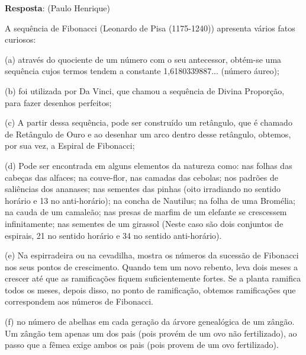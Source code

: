 {\color{red}
\textbf{Resposta}: (Paulo Henrique)

A sequência de Fibonacci (Leonardo de Pisa (1175-1240)) apresenta vários fatos curiosos:

(a) através do quociente de um número com o seu antecessor, obtém-se uma sequência cujos termos tendem a constante 1,6180339887... (número áureo);

(b) foi utilizada por Da Vinci, que chamou a sequência de Divina Proporção, para fazer desenhos perfeitos;

(c) A partir dessa sequência, pode ser construído um retângulo, que é chamado de Retângulo de Ouro e ao desenhar um arco dentro desse retângulo, obtemos, por sua vez, a Espiral de Fibonacci;

(d) Pode ser encontrada em alguns elementos da natureza como:
nas folhas das cabeças das alfaces;
na couve-flor,
nas camadas das cebolas;
nos padrões de saliências dos ananases;
nas sementes das pinhas (oito irradiando no sentido horário e 13 no anti-horário);
na concha de Nautilus;
na folha de uma Bromélia;
na cauda de um camaleão;
nas presas de marfim de um elefante se crescessem infinitamente;
nas sementes de um girassol (Neste caso são dois conjuntos de espirais, 21 no sentido horário e 34 no sentido anti-horário).


(e) Na espirradeira ou na cevadilha, mostra os números da sucessão de Fibonacci nos seus pontos de crescimento. Quando tem um novo rebento, leva dois meses a crescer até que as ramificações fiquem suficientemente fortes. Se a planta ramifica todos os meses, depois disso, no ponto de ramificação, obtemos ramificações que correspondem aos números de Fibonacci.

(f) no número de abelhas em cada geração da árvore genealógica de um zângão. Um zângão tem apenas um dos pais (pois provém de um ovo não fertilizado), ao passo que a fêmea exige ambos os pais (pois provem de um ovo fertilizado).
}


